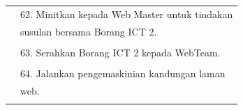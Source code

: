 \documentclass[
]{article}
\begin{document}
\begin{longtable}[]{@{}ll@{}}
\begin{minipage}[t]{0.23\columnwidth}\raggedright
\strut
\end{minipage} & \begin{minipage}[t]{0.71\columnwidth}\raggedright
62. Minitkan kepada Web Master untuk tindakan\strut
\end{minipage}\tabularnewline
\begin{minipage}[t]{0.23\columnwidth}\raggedright
\strut
\end{minipage} & \begin{minipage}[t]{0.71\columnwidth}\raggedright
susulan bersama Borang ICT 2.\strut
\end{minipage}\tabularnewline
\begin{minipage}[t]{0.23\columnwidth}\raggedright
\strut
\end{minipage} & \begin{minipage}[t]{0.71\columnwidth}\raggedright
\strut
\end{minipage}\tabularnewline
\begin{minipage}[t]{0.23\columnwidth}\raggedright
\strut
\end{minipage} & \begin{minipage}[t]{0.71\columnwidth}\raggedright
63. Serahkan Borang ICT 2 kepada WebTeam.\strut
\end{minipage}\tabularnewline
\begin{minipage}[t]{0.23\columnwidth}\raggedright
\strut
\end{minipage} & \begin{minipage}[t]{0.71\columnwidth}\raggedright
\strut
\end{minipage}\tabularnewline
\begin{minipage}[t]{0.23\columnwidth}\raggedright
\strut
\end{minipage} & \begin{minipage}[t]{0.71\columnwidth}\raggedright
64. Jalankan pengemaskinian kandungan laman\strut
\end{minipage}\tabularnewline
\begin{minipage}[t]{0.23\columnwidth}\raggedright
\strut
\end{minipage} & \begin{minipage}[t]{0.71\columnwidth}\raggedright
web.\strut
\end{minipage}\tabularnewline
\begin{minipage}[t]{0.23\columnwidth}\raggedright
\strut
\end{minipage} & \begin{minipage}[t]{0.71\columnwidth}\raggedright

\end{minipage}
\end{longtable}
\end{document}
